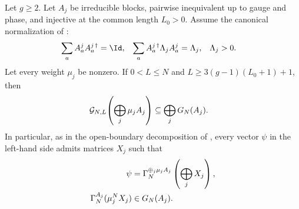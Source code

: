 \begin{lemma}
    \label{lem:bnt_block_diagonal_open_boundary_matrices_source_length}
    \leanok
    Let $g\ge2$. Let $A_j$ be irreducible blocks, pairwise inequivalent up to
    gauge and phase, and injective at the common
    length $L_0>0$. Assume the canonical normalization of
    \cite{PerezGarcia2007Matrix}:
    \begin{align}
        \sum_aA^j_aA^{j\,\dagger}_a & =\Id,
                                    & \sum_aA^{j\,\dagger}_a\Lambda_jA^j_a & =\Lambda_j,
                                    & \Lambda_j                            & >0.
        \notag
    \end{align}
    Let every weight $\mu_j$ be nonzero. If
    $0<L\le N$ and $L\ge3(g-1)(L_0+1)+1$, then
    \begin{align}
        \mathcal G_{N,L}\!\left(\bigoplus_j\mu_jA_j\right)
         & \subseteq\bigoplus_jG_N(A_j).
        \notag
    \end{align}
    In particular, as in the open-boundary decomposition of
    \cite[Theorem~12, proof lines~1424--1456]{PerezGarcia2007Matrix}, every
    vector $\psi$ in the left-hand side admits matrices $X_j$ such that
    \begin{align}
        \psi
         & =\Gamma_N^{\oplus_j\mu_jA_j}
        \left(\bigoplus_jX_j\right),
        \notag                          \\
        \Gamma_N^{A_j}(\mu_j^NX_j)
         & \in G_N(A_j).
        \notag
    \end{align}
\end{lemma}

